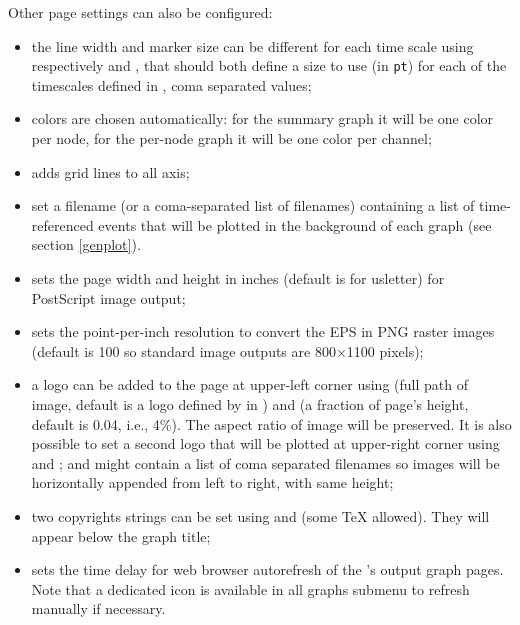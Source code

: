 Other page settings can also be configured:
\begin{itemize}
	\item the line width and marker size can be different for each time scale using respectively  and , that should both define a size to use (in \texttt{pt}) for each of the timescales defined in
  , coma separated values;
	\item colors are chosen automatically: for the summary graph it will be one color per node, for the per-node graph it will be one color per channel;
	\item {} adds grid lines to all axis;
	\item {} set a filename (or a coma-separated list of filenames) containing a list of time-referenced events that will be plotted in the background of each graph (see section \ref{genplot}).
	\item {} sets the page width and height in inches (default is  for usletter) for PostScript image output;
	\item {} sets the point-per-inch resolution to convert the EPS in PNG raster images (default is 100 so standard image outputs are 800$\times$1100 pixels); 
	\item a logo can be added to the page at upper-left corner using  (full path of image, default is a \webobs logo defined by  in ) and  (a fraction of page's height, default is 0.04, i.e., 4\%). The aspect ratio of image will be preserved. It is also possible to set a second logo that will be plotted at upper-right corner using  and ;  and  might contain a list of coma separated filenames so images will be horizontally appended from left to right, with same height;
	\item two copyrights strings can be set using  and  (some TeX allowed). They will appear below the graph title;
	\item {} sets the time delay for web browser autorefresh of the 's output graph pages. Note that a dedicated icon is available in all graphs submenu to refresh manually if necessary.
\end{itemize}


